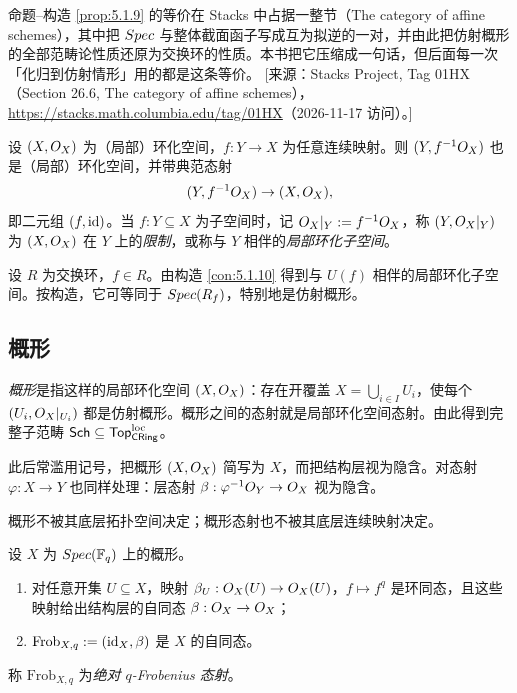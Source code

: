 \begin{yizhu}
命题--构造 \ref{prop:5.1.9} 的等价在 Stacks 中占据一整节（The category of affine schemes），其中把 $Spec$ 与整体截面函子写成互为拟逆的一对，并由此把仿射概形的全部范畴论性质还原为交换环的性质。本书把它压缩成一句话，但后面每一次「化归到仿射情形」用的都是这条等价。
[来源：Stacks Project, Tag 01HX（Section 26.6, The category of affine schemes），\url{https://stacks.math.columbia.edu/tag/01HX}（2026-11-17 访问）。]
\end{yizhu}

\begin{construction}\label{con:5.1.10}
设 $(X,O_X)$ 为（局部）环化空间，$f:Y\to X$ 为任意连续映射。则 $(Y,f^{-1}O_X)$ 也是（局部）环化空间，并带典范态射
\[
(Y,f^{-1}O_X)\to(X,O_X),
\]
即二元组 $(f,\operatorname{id})$。当 $f:Y\subseteq X$ 为子空间时，记 $O_X|_Y:=f^{-1}O_X$，称 $(Y,O_X|_Y)$ 为 $(X,O_X)$ 在 $Y$ 上的\emph{限制}，或称与 $Y$ 相伴的\emph{局部环化子空间}。
\end{construction}

\begin{example}\label{ex:5.1.11}
设 $R$ 为交换环，$f\in R$。由构造 \ref{con:5.1.10} 得到与 $U(f)$ 相伴的局部环化子空间。按构造，它可等同于 $Spec(R_f)$，特别地是仿射概形。
\end{example}

\subsection{概形}\label{sec:5.2}

\begin{definition}\label{def:5.2.1}
\emph{概形}是指这样的局部环化空间 $(X,O_X)$：存在开覆盖 $X=\bigcup_{i\in I}U_i$，使每个 $(U_i,O_X|_{U_i})$ 都是仿射概形。概形之间的态射就是局部环化空间态射。由此得到完整子范畴 $\mathsf{Sch}\subseteq\mathsf{Top}^{\mathrm{loc}}_{\mathsf{CRing}}$。
\end{definition}

\begin{notation}\label{not:5.2.2}
此后常滥用记号，把概形 $(X,O_X)$ 简写为 $X$，而把结构层视为隐含。对态射 $\varphi:X\to Y$ 也同样处理：层态射 $\beta:\varphi^{-1}O_Y\to O_X$ 视为隐含。
\end{notation}

\begin{warning}\label{warn:5.2.3}
概形不被其底层拓扑空间决定；概形态射也不被其底层连续映射决定。
\end{warning}

\begin{exercise}\label{exc:5.2.4}
设 $X$ 为 $Spec(\mathbb{F}_q)$ 上的概形。
\begin{enumerate}[label=(\roman*),leftmargin=2em,itemsep=0.25ex]
  \item 对任意开集 $U\subseteq X$，映射 $\beta_U:O_X(U)\to O_X(U)$，$f\mapsto f^q$ 是环同态，且这些映射给出结构层的自同态 $\beta:O_X\to O_X$；
  \item $\mathrm{Frob}_{X,q}:=(\operatorname{id}_X,\beta)$ 是 $X$ 的自同态。
\end{enumerate}
称 $\mathrm{Frob}_{X,q}$ 为\emph{绝对 $q$-Frobenius 态射}。
\end{exercise}

